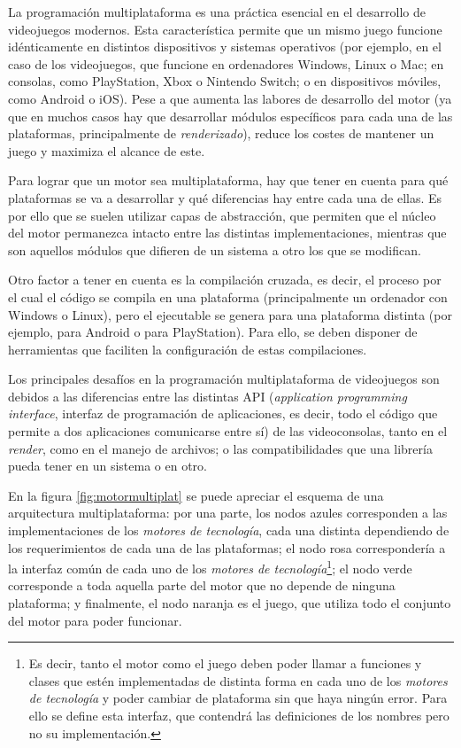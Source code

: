 La programación multiplataforma es una práctica esencial en el desarrollo de videojuegos modernos. Esta característica permite que un mismo juego funcione idénticamente en distintos dispositivos y sistemas operativos (por ejemplo, en el caso de los videojuegos, que funcione en ordenadores Windows, Linux o Mac; en consolas, como PlayStation, Xbox o Nintendo Switch; o en dispositivos móviles, como Android o iOS). Pese a que aumenta las labores de desarrollo del motor (ya que en muchos casos hay que desarrollar módulos específicos para cada una de las plataformas, principalmente de \textit{renderizado}), reduce los costes de mantener un juego y maximiza el alcance de este.

\medskip

Para lograr que un motor sea multiplataforma, hay que tener en cuenta para qué plataformas se va a desarrollar y qué diferencias hay entre cada una de ellas. Es por ello que se suelen utilizar capas de abstracción, que permiten que el núcleo del motor permanezca intacto entre las distintas implementaciones, mientras que son aquellos módulos que difieren de un sistema a otro los que se modifican.

\smallskip

Otro factor a tener en cuenta es la compilación cruzada, es decir, el proceso por el cual el código se compila en una plataforma (principalmente un ordenador con Windows o Linux), pero el ejecutable se genera para una plataforma distinta (por ejemplo, para Android o para PlayStation). Para ello, se deben disponer de herramientas que faciliten la configuración de estas compilaciones.

\medskip

Los principales desafíos en la programación multiplataforma de videojuegos son debidos a las diferencias entre las distintas API (\textit{application programming interface}, interfaz de programación de aplicaciones, es decir, todo el código que permite a dos aplicaciones comunicarse entre sí) de las videoconsolas, tanto en el \textit{render}, como en el manejo de archivos; o las compatibilidades que una librería pueda tener en un sistema o en otro.

\medskip

En la figura \ref{fig:motormultiplat} se puede apreciar el esquema de una arquitectura multiplataforma: por una parte, los nodos azules corresponden a las implementaciones de los \textit{motores de tecnología}, cada una distinta dependiendo de los requerimientos de cada una de las plataformas; el nodo rosa correspondería a la interfaz común de cada uno de los \textit{motores de tecnología}\footnote{Es decir, tanto el motor como el juego deben poder llamar a funciones y clases que estén implementadas de distinta forma en cada uno de los \textit{motores de tecnología} y poder cambiar de plataforma sin que haya ningún error. Para ello se define esta interfaz, que contendrá las definiciones de los nombres pero no su implementación.}; el nodo verde corresponde a toda aquella parte del motor que no depende de ninguna plataforma; y finalmente, el nodo naranja es el juego, que utiliza todo el conjunto del motor para poder funcionar.

